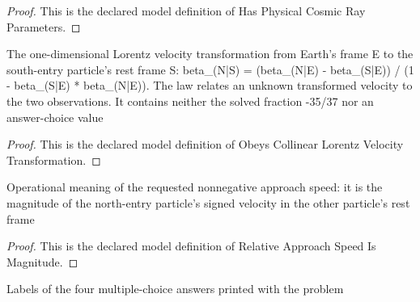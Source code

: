 \begin{proof}
  This is the declared model definition of Has Physical Cosmic Ray Parameters.
\end{proof}
\begin{definition}
  \label{def:physics:phyx-mini-0591:phyxminiproblems-problemphyxmini0591-obeyscollinearlorentzvelocitytransformation}
  The one-dimensional Lorentz velocity transformation from Earth's frame E to the south-entry particle's rest frame S: beta\_(N|S) = (beta\_(N|E) - beta\_(S|E)) / (1 - beta\_(S|E) * beta\_(N|E)). The law relates an unknown transformed velocity to the two observations. It contains neither the solved fraction -35/37 nor an answer-choice value
\end{definition}
\begin{proof}
  This is the declared model definition of Obeys Collinear Lorentz Velocity Transformation.
\end{proof}
\begin{definition}
  \label{def:physics:phyx-mini-0591:phyxminiproblems-problemphyxmini0591-relativeapproachspeedismagnitude}
  Operational meaning of the requested nonnegative approach speed: it is the magnitude of the north-entry particle's signed velocity in the other particle's rest frame
\end{definition}
\begin{proof}
  This is the declared model definition of Relative Approach Speed Is Magnitude.
\end{proof}
\begin{definition}
  \label{def:physics:phyx-mini-0591:phyxminiproblems-problemphyxmini0591-answerchoice}
  Labels of the four multiple-choice answers printed with the problem
\end{definition}
